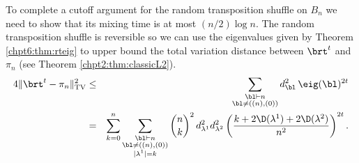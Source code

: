 \documentclass[11pt]{report}
\begin{document}
To complete a cutoff argument for the random transposition shuffle on $B_{n}$ we need to show that its mixing time is at most $(n/2)\log n$.
The random transposition shuffle is reversible so we can use the eigenvalues given by Theorem \ref{chpt6:thm:rteig} to upper bound the total variation distance between $\brt^{t}$ and $\pi_{n}$ (see Theorem \ref{chpt2:thm:classicL2}). 
\begin{eqnarray}
4 \lVert \brt^{t} - \pi_{n} \rVert_{\tiny\textnormal{TV}}^{2} & \leq & \sum_{\substack{\bl \vdash n \\ \bl \neq ((n),(0))}} d_{\bl}^{2} \,  \eig(\bl)^{2t} \\
& = & \sum_{k=0}^{n} \sum_{\substack{\bl \vdash n \\ \bl \neq ((n),(0)) \\ |\lambda^{1} | = k}}  {n \choose k}^{2} \,  d_{\lambda^{1}}^{2} d_{\lambda^{2}}^{2} \left( \frac{k +2\D(\lambda^{1})+2\D(\lambda^{2})}{n^{2}}\right)^{2t}. \label{chpt6:eqn:rtbound1}
\end{eqnarray}















\paragraph{}
\end{document}
